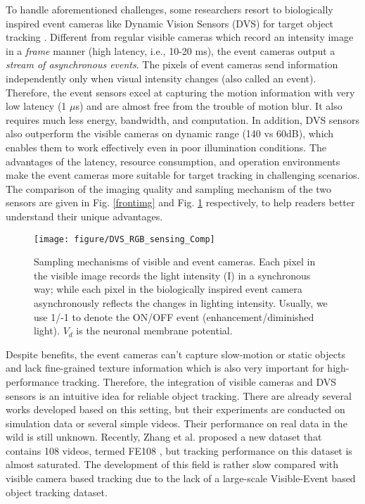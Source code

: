 \documentclass[journal]{IEEEtran}
\begin{document}
 
To handle aforementioned challenges, some researchers resort to biologically inspired event cameras like Dynamic Vision Sensors (DVS) \cite{2008dvs} for target object tracking \cite{chen2020eventTrack, ramesh2020etld, camunas2017event, chen2019asynchronouseventtrack, yang2019dashnet}. Different from regular visible cameras which record an intensity image in a \emph{frame} manner (high latency, i.e., 10-20 ms), the event cameras output a \emph{stream of asynchronous events}. The pixels of event cameras send information independently only when visual intensity changes (also called an event). Therefore, the event sensors excel at capturing the motion information with very low latency (1 $\mu$s) and are almost free from the trouble of motion blur. It also requires much less energy, bandwidth, and computation. In addition, DVS sensors also outperform the visible cameras on dynamic range (140 vs 60dB), which enables them to work effectively even in poor illumination conditions. The advantages of the latency, resource consumption, and operation environments make the event cameras more suitable for target tracking in challenging scenarios. The comparison of the imaging quality and sampling mechanism of the two sensors are given in Fig. \ref{frontimg} and Fig. \ref{sampleScheme} respectively, to help readers better understand their unique advantages. 


\begin{figure} 
\center
\texttt{[image: figure/DVS\_RGB\_sensing\_Comp]}
\caption{Sampling mechanisms of visible and event cameras. Each pixel in the visible image records the light intensity (I) in a synchronous way; while each pixel in the biologically inspired event camera asynchronously reflects the changes in lighting intensity. Usually, we use 1/-1 to denote the ON/OFF event (enhancement/diminished light). $V_d$ is the neuronal membrane potential.}
\label{sampleScheme}
\end{figure} 




Despite benefits, the event cameras can't capture slow-motion or static objects and lack fine-grained texture information which is also very important for high-performance tracking. Therefore, the integration of visible cameras and DVS sensors is an intuitive idea for reliable object tracking. There are already several works \cite{liu2016combined, chen2019asynchronouseventtrack, huang2018event, yang2019dashnet} developed based on this setting, but their experiments are conducted on simulation data or several simple videos. Their performance on real data in the wild is still unknown. Recently, Zhang et al. proposed a new dataset that contains 108 videos, termed FE108 \cite{Zhang2021FE108}, but tracking performance on this dataset is almost saturated. The development of this field is rather slow compared with visible camera based tracking due to the lack of a large-scale Visible-Event based object tracking dataset. 
\end{document}
